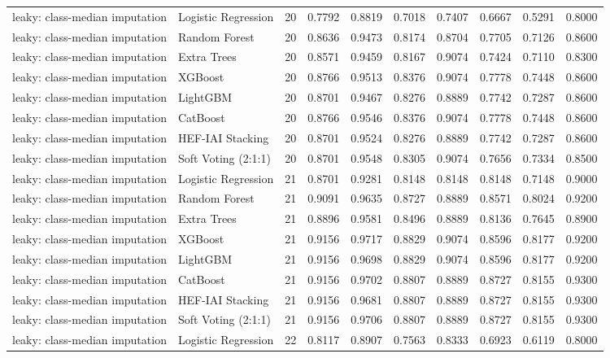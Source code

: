 \begin{tabular}{llrrrrrrrr}
leaky: class-median imputation & Logistic Regression & 20 & 0.7792 & 0.8819 & 0.7018 & 0.7407 & 0.6667 & 0.5291 & 0.8000 \\
leaky: class-median imputation & Random Forest & 20 & 0.8636 & 0.9473 & 0.8174 & 0.8704 & 0.7705 & 0.7126 & 0.8600 \\
leaky: class-median imputation & Extra Trees & 20 & 0.8571 & 0.9459 & 0.8167 & 0.9074 & 0.7424 & 0.7110 & 0.8300 \\
leaky: class-median imputation & XGBoost & 20 & 0.8766 & 0.9513 & 0.8376 & 0.9074 & 0.7778 & 0.7448 & 0.8600 \\
leaky: class-median imputation & LightGBM & 20 & 0.8701 & 0.9467 & 0.8276 & 0.8889 & 0.7742 & 0.7287 & 0.8600 \\
leaky: class-median imputation & CatBoost & 20 & 0.8766 & 0.9546 & 0.8376 & 0.9074 & 0.7778 & 0.7448 & 0.8600 \\
leaky: class-median imputation & HEF-IAI Stacking & 20 & 0.8701 & 0.9524 & 0.8276 & 0.8889 & 0.7742 & 0.7287 & 0.8600 \\
leaky: class-median imputation & Soft Voting (2:1:1) & 20 & 0.8701 & 0.9548 & 0.8305 & 0.9074 & 0.7656 & 0.7334 & 0.8500 \\
leaky: class-median imputation & Logistic Regression & 21 & 0.8701 & 0.9281 & 0.8148 & 0.8148 & 0.8148 & 0.7148 & 0.9000 \\
leaky: class-median imputation & Random Forest & 21 & 0.9091 & 0.9635 & 0.8727 & 0.8889 & 0.8571 & 0.8024 & 0.9200 \\
leaky: class-median imputation & Extra Trees & 21 & 0.8896 & 0.9581 & 0.8496 & 0.8889 & 0.8136 & 0.7645 & 0.8900 \\
leaky: class-median imputation & XGBoost & 21 & 0.9156 & 0.9717 & 0.8829 & 0.9074 & 0.8596 & 0.8177 & 0.9200 \\
leaky: class-median imputation & LightGBM & 21 & 0.9156 & 0.9698 & 0.8829 & 0.9074 & 0.8596 & 0.8177 & 0.9200 \\
leaky: class-median imputation & CatBoost & 21 & 0.9156 & 0.9702 & 0.8807 & 0.8889 & 0.8727 & 0.8155 & 0.9300 \\
leaky: class-median imputation & HEF-IAI Stacking & 21 & 0.9156 & 0.9681 & 0.8807 & 0.8889 & 0.8727 & 0.8155 & 0.9300 \\
leaky: class-median imputation & Soft Voting (2:1:1) & 21 & 0.9156 & 0.9706 & 0.8807 & 0.8889 & 0.8727 & 0.8155 & 0.9300 \\
leaky: class-median imputation & Logistic Regression & 22 & 0.8117 & 0.8907 & 0.7563 & 0.8333 & 0.6923 & 0.6119 & 0.8000 \\

\end{tabular}
